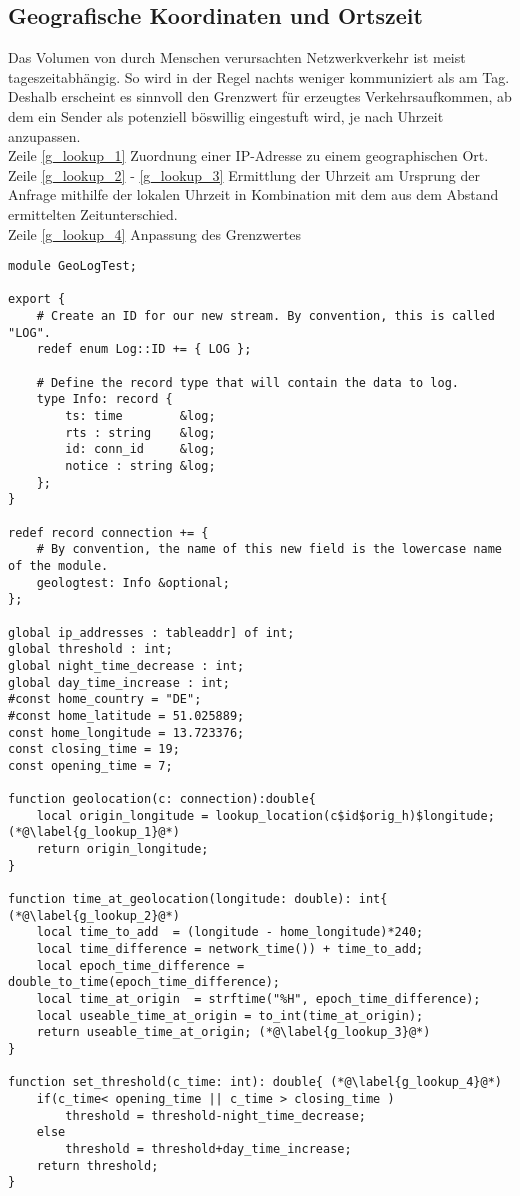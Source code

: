 \subsection{Geografische Koordinaten und Ortszeit}
Das Volumen von durch Menschen verursachten Netzwerkverkehr ist meist tageszeitabhängig. So wird in der Regel nachts weniger kommuniziert als am Tag. Deshalb erscheint es sinnvoll den Grenzwert für erzeugtes Verkehrsaufkommen, ab dem ein Sender als potenziell böswillig eingestuft wird, je nach Uhrzeit anzupassen.\\
Zeile \ref{g_lookup_1} Zuordnung einer IP-Adresse zu einem geographischen Ort.\\
Zeile \ref{g_lookup_2} - \ref{g_lookup_3} Ermittlung der Uhrzeit am Ursprung der Anfrage mithilfe der lokalen Uhrzeit in Kombination mit dem aus dem Abstand ermittelten Zeitunterschied.\\
Zeile \ref{g_lookup_4} Anpassung des Grenzwertes\\
\begin{lstlisting}[consecutivenumbers=false,caption={Geolokalisierung und Setzen des Grenzwertes},firstnumber=31,linerange={31-37,42-54}]
module GeoLogTest;

export {
    # Create an ID for our new stream. By convention, this is called "LOG".
    redef enum Log::ID += { LOG };

    # Define the record type that will contain the data to log.
    type Info: record {
        ts: time        &log;
        rts : string 	&log;
        id: conn_id     &log; 
        notice : string &log;
    };
}

redef record connection += {
    # By convention, the name of this new field is the lowercase name of the module.
    geologtest: Info &optional;
};

global ip_addresses : tableaddr] of int;
global threshold : int; 
global night_time_decrease : int;
global day_time_increase : int;
#const home_country = "DE";
#const home_latitude = 51.025889;
const home_longitude = 13.723376;
const closing_time = 19;
const opening_time = 7;

function geolocation(c: connection):double{
	local origin_longitude = lookup_location(c$id$orig_h)$longitude;(*@\label{g_lookup_1}@*)
	return origin_longitude;
}

function time_at_geolocation(longitude: double): int{ (*@\label{g_lookup_2}@*)
	local time_to_add  = (longitude - home_longitude)*240;
	local time_difference = network_time()) + time_to_add;
	local epoch_time_difference = double_to_time(epoch_time_difference);
	local time_at_origin  = strftime("%H", epoch_time_difference);
	local useable_time_at_origin = to_int(time_at_origin);
	return useable_time_at_origin; (*@\label{g_lookup_3}@*)
}

function set_threshold(c_time: int): double{ (*@\label{g_lookup_4}@*)
	if(c_time< opening_time || c_time > closing_time )
		threshold = threshold-night_time_decrease;
	else 
		threshold = threshold+day_time_increase;
	return threshold; 
}
\end{lstlisting}

